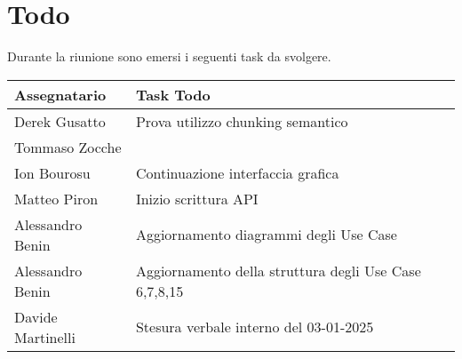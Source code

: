 \section{Todo}
Durante la riunione sono emersi i seguenti task da svolgere.

\begin{center}
  \begin{tabular}{|L{5cm}|L{8cm}|}
    \hline
    \textbf{Assegnatario} & \textbf{Task Todo} \\ \hline
        Derek Gusatto & Prova utilizzo chunking semantico \\  Tommaso Zocche & \\ \hline
        Ion Bourosu & Continuazione interfaccia grafica \\ \hline
        Matteo Piron & Inizio scrittura API \\ \hline
        Alessandro Benin & Aggiornamento diagrammi degli Use Case \\ \hline
        Alessandro Benin & Aggiornamento della struttura degli Use Case 6,7,8,15 \\ \hline
        Davide Martinelli & Stesura verbale interno del 03-01-2025 \\ \hline
  \end{tabular}
\end{center}